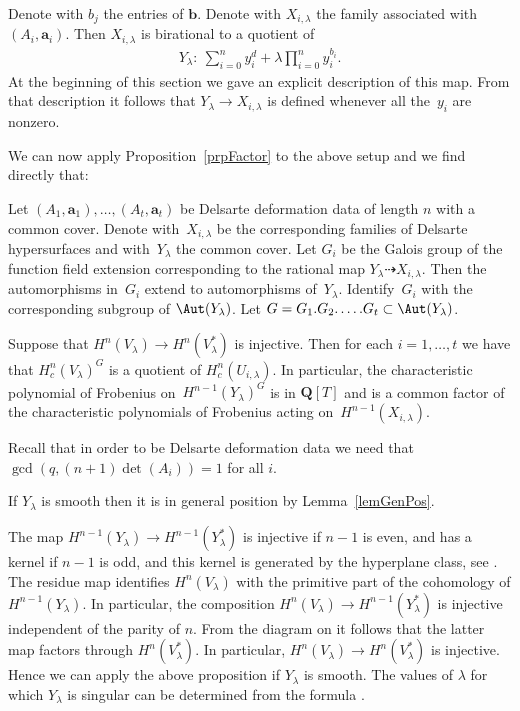 Denote with $b_j$ the entries of $\mathbf{b}$. Denote with $X_{i,\lambda}$ the family associated with $(A_i,\mathbf{a}_i)$. Then $X_{i,\lambda}$ is birational to a quotient of
\begin{gather*}Y_\lambda\colon \ \sum_{i=0}^n y_i^{d} +\lambda \prod_{i=0}^n y_i^{b_i}.\end{gather*}
At the beginning of this section we gave an explicit description of this map. From that description it follows that $Y_\lambda \to X_{i,\lambda}$ is def\/ined whenever all the~$y_i$ are nonzero.

We can now apply Proposition~\ref{prpFactor} to the above setup and we f\/ind directly that:

\begin{Theorem} \label{thmMainO} Let $(A_1,\mathbf{a}_1), \dots, (A_t,\mathbf{a}_t)$ be Delsarte deformation data of length $n$ with a common cover. Denote with~$X_{i,\lambda}$ be the corresponding families of Delsarte hypersurfaces and with~$Y_\lambda$ the common cover. Let $G_i$ be the Galois group of the function field extension corresponding to the rational map $Y_\lambda\dashrightarrow X_{i,\lambda}$. Then the automorphisms in~$G_i$ extend to automorphisms of~$Y_{\lambda}$. Identify~$G_i$ with the corresponding subgroup of $\Aut(Y_{\lambda})$. Let $G=G_1.G_2.\dots.G_t\subset \Aut(Y_\lambda)$.

Suppose that $H^n(V_\lambda)\to H^n(V_\lambda^*)$ is injective. Then for each $i=1,\dots,t$ we have that $H^n_c(V_{\lambda})^G$ is a quotient of $H^n_c(U_{i,\lambda})$. In particular, the characteristic polynomial of Frobenius on~$H^{n-1}(Y_\lambda)^G$ is in $\mathbf{Q}[T]$ and is a common factor of the characteristic polynomials of Frobenius acting on~$H^{n-1}(X_{i,\lambda})$.
\end{Theorem}

\begin{Remark} Recall that in order to be Delsarte deformation data we need that $\gcd(q,(n+1)\det(A_i))=1$ for all $i$.
\end{Remark}

\begin{Remark} If $Y_\lambda$ is smooth then it is in general position by Lemma~\ref{lemGenPos}.

The map $H^ {n-1}(Y_{\lambda})\to H^{n-1}(Y_{\lambda}^*)$ is injective if $n-1$ is even, and has a kernel if $n-1$ is odd, and this kernel is generated by the hyperplane class, see \cite[Theorem~1.19]{Katz}. The residue map identif\/ies $H^{n}(V_{\lambda})$ with the primitive part of the cohomology of $H^{n-1}(Y_{\lambda})$. In particular, the composition $H^n(V_{\lambda})\to H^{n-1}(Y_{\lambda}^*)$ is injective independent of the parity of $n$. From the diagram on \cite[p.~79]{Katz} it follows that the latter map factors through $H^n(V_\lambda^*)$. In particular, $H^n(V_\lambda)\to H^n(V_\lambda^*)$ is injective. Hence we can apply the above proposition if $Y_\lambda$ is smooth. The values of $\lambda$ for which $Y_\lambda$ is singular can be determined from the formula \cite[Lemma~3.7]{zetafam}.
\end{Remark}
